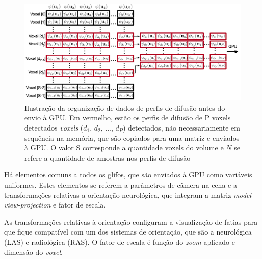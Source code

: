\documentclass[
    12pt,                %
    oneside,            %
    a4paper,            %
    english,            %
    french,                %
    spanish,            %
    brazil                %
    ]{abntex2}
\begin{document}
\begin{figure}[ht]

    \centering
    \includegraphics[width=1.000\linewidth, angle=0]{figs/Esquema_Glifo/organizacao2GPU.png}
    \caption{Ilustração da organização de dados de perfis de difusão antes do envio à GPU. Em vermelho, estão os perfis de difusão de P voxels detectados \textit{voxels} ($d_1$, $d_2$, ..., $d_P$) detectados, não necessariamente em sequência na memória, que são copiados para uma matriz e enviados à GPU. O valor S corresponde a quantidade voxels do volume e $N$ se refere a quantidade de amostras nos perfis de difusão}
    \label{fig::organizacao2GPU}
   \hspace{1pt}
\end{figure}


Há elementos comuns a todos os glifos, que são enviados à GPU como variáveis uniformes. Estes elementos se referem a parâmetros de câmera na cena e a transformações relativas a orientação neurológica, que integram a matriz \textit{model-view-projection} e fator de escala.

As transformações relativas à orientação configuram a visualização de fatias para que fique compatível com um dos sistemas de orientação, que são a neurológica (LAS) e radiológica (RAS). O fator de escala é função do \textit{zoom} aplicado e dimensão do \textit{voxel}.








\end{document}
